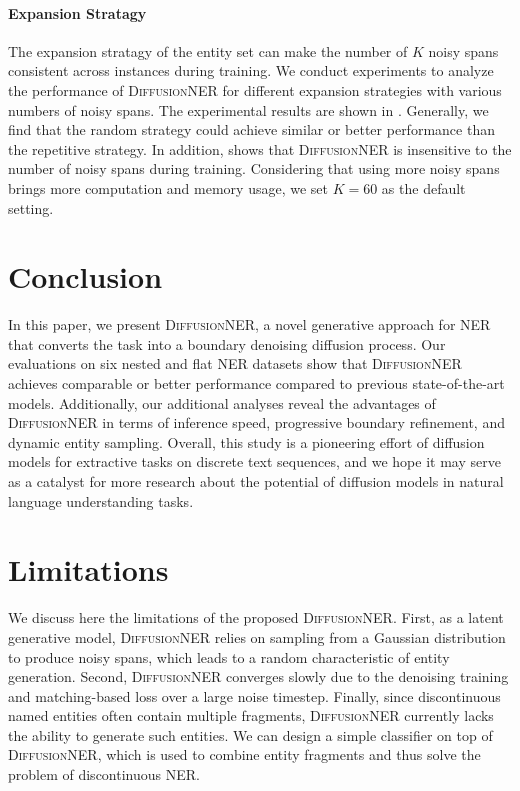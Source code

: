 \documentclass[11pt]{article}
\begin{document}
\paragraph{Expansion Stratagy}
\label{ana:expansion}
The expansion stratagy of the entity set can make the number of $K$ noisy spans consistent across instances during training. We conduct experiments to analyze the performance of \textsc{DiffusionNER} for different expansion strategies with various numbers of noisy spans. The experimental results are shown in . Generally, we find that the random strategy could achieve similar or better performance than the repetitive strategy. In addition,  shows that \textsc{DiffusionNER} is insensitive to the number of noisy spans during training. Considering that using more noisy spans brings more computation and memory usage, we set $K=60$ as the default setting.


\section{Conclusion}


In this paper, we present \textsc{DiffusionNER}, a novel generative approach for NER that converts the task into a boundary denoising diffusion process. Our evaluations on six nested and flat NER datasets show that \textsc{DiffusionNER} achieves comparable or better performance compared to previous state-of-the-art models. Additionally, our additional analyses reveal the advantages of \textsc{DiffusionNER} in terms of inference speed, progressive boundary refinement, and dynamic entity sampling. Overall, this study is a pioneering effort of diffusion models for extractive tasks on discrete text sequences, and we hope it may serve as a catalyst for more research about the potential of diffusion models in natural language understanding tasks.



\section*{Limitations}

We discuss here the limitations of the proposed \textsc{DiffusionNER}. First, as a latent generative model, \textsc{DiffusionNER} relies on sampling from a Gaussian distribution to produce noisy spans, which leads to a random characteristic of entity generation. Second, \textsc{DiffusionNER} converges slowly due to the denoising training and matching-based loss over a large noise timestep. Finally, since discontinuous named entities often contain multiple fragments, \textsc{DiffusionNER} currently lacks the ability to generate such entities.
We can design a simple classifier on top of \textsc{DiffusionNER}, which is used to combine entity fragments and thus solve the problem of discontinuous NER.
\end{document}

